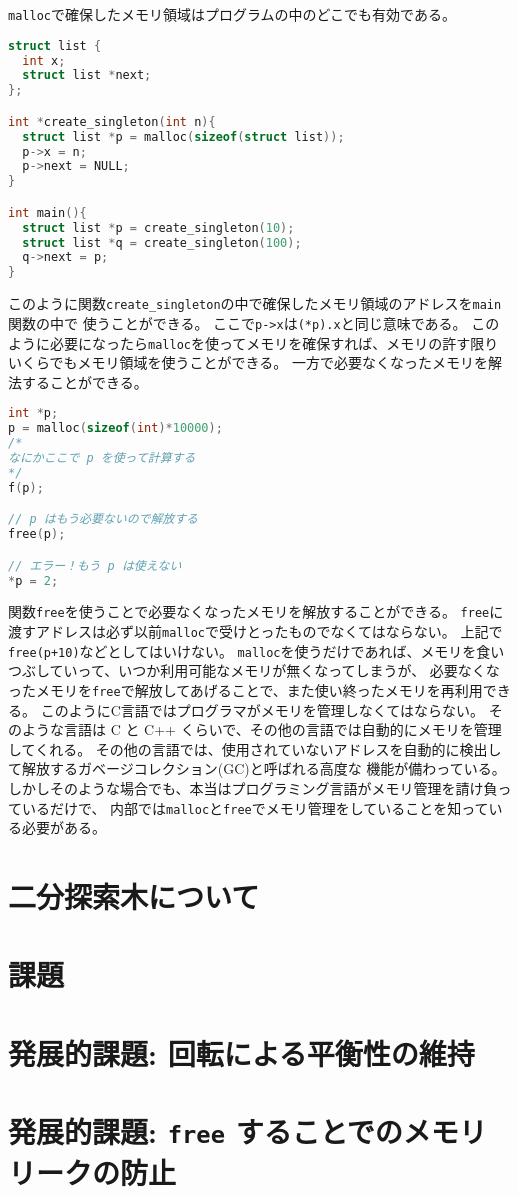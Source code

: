 \documentclass[a4paper,twoside,onecolumn,openany,article]{memoir}
\theoremstyle{remark}
\begin{document}
\texttt{malloc}で確保したメモリ領域はプログラムの中のどこでも有効である。

\begin{lstlisting}[basicstyle=\ttfamily\small,showstringspaces=false,language=C,frame=single]
struct list {
  int x;
  struct list *next;
};

int *create_singleton(int n){
  struct list *p = malloc(sizeof(struct list));
  p->x = n;
  p->next = NULL;
}

int main(){
  struct list *p = create_singleton(10);
  struct list *q = create_singleton(100);
  q->next = p;
}
\end{lstlisting}
このように関数\texttt{create\_singleton}の中で確保したメモリ領域のアドレスを\texttt{main}関数の中で
使うことができる。
ここで\texttt{p->x}は\texttt{(*p).x}と同じ意味である。
このように必要になったら\texttt{malloc}を使ってメモリを確保すれば、メモリの許す限りいくらでもメモリ領域を使うことができる。
一方で必要なくなったメモリを解法することができる。

\begin{lstlisting}[basicstyle=\ttfamily\small,showstringspaces=false,language=C,frame=single]
int *p;
p = malloc(sizeof(int)*10000);
/*
なにかここで p を使って計算する
*/
f(p);

// p はもう必要ないので解放する
free(p);

// エラー！もう p は使えない
*p = 2;
\end{lstlisting}
関数\texttt{free}を使うことで必要なくなったメモリを解放することができる。
\texttt{free}に渡すアドレスは必ず以前\texttt{malloc}で受けとったものでなくてはならない。
上記で\texttt{free(p+10)}などとしてはいけない。
\texttt{malloc}を使うだけであれば、メモリを食いつぶしていって、いつか利用可能なメモリが無くなってしまうが、
必要なくなったメモリを\texttt{free}で解放してあげることで、また使い終ったメモリを再利用できる。
このようにC言語ではプログラマがメモリを管理しなくてはならない。
そのような言語は C と C++ くらいで、その他の言語では自動的にメモリを管理してくれる。
その他の言語では、使用されていないアドレスを自動的に検出して解放するガベージコレクション(GC)と呼ばれる高度な
機能が備わっている。
しかしそのような場合でも、本当はプログラミング言語がメモリ管理を請け負っているだけで、
内部では\texttt{malloc}と\texttt{free}でメモリ管理をしていることを知っている必要がある。

\section{二分探索木について}

\section{課題}

\section{発展的課題: 回転による平衡性の維持}

\section{発展的課題: \texttt{free} することでのメモリリークの防止}
\end{document}
